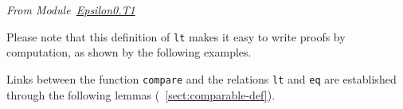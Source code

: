 \vspace{4pt}
\emph{From Module~\href{../theories/html/hydras.Epsilon0.T1.html\#compare}{Epsilon0.T1}}




\label{Predicates:lt-T1}
Please note that this definition of \texttt{lt} makes it easy to write proofs by computation, as shown by the following examples.

\vspace{4pt}





Links between the function \texttt{compare} and the relations
\texttt{lt} and \texttt{eq} are established through the following lemmas (~\vref{sect:comparable-def}).
\vspace{4pt}










  



